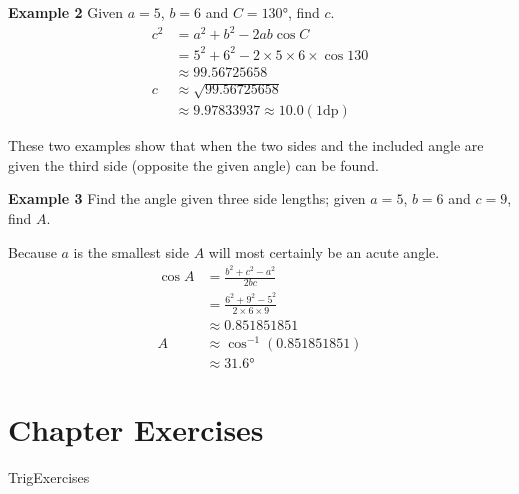 \textbf{Example 2}
Given $a =5$, $b =6$ and $C =\ang{130} $, find $c$.
\begin{align*}c^{2} &  = a^{2} +b^{2} -2 a b \cos  C \\
&  = 5^{2} +6^{2} -2 \times 5 \times 6 \times \cos  130  \\
&  \approx   99.56725658 \\
c &  \approx   \sqrt{99.56725658} \\
&  \approx   9.97833937 \approx 10.0 \left (1\text{dp}\right )\end{align*}

These two examples show that when the two sides and the included angle are given the third side
(opposite the given angle) can be found. 

\textbf{Example 3} Find the angle given three side lengths; given $a =5$, $b =6$ and $c =9$, find $A$. 

Because $a$ is the smallest side $A$ will most certainly be an acute angle.
\begin{align*}\cos  A &  = \frac{b^{2} +c^{2} -a^{2}}{2 b c} \\
&  = \frac{6^{2} +9^{2} -5^{2}}{2 \times 6 \times 9} \\
&  \approx 0.851851851 \\
A &  \approx \cos ^{ -1} \left (0.851851851\right ) \\
&  \approx \ang{31.6} 
\end{align*}

\section{Chapter Exercises}
{TrigExercises}

